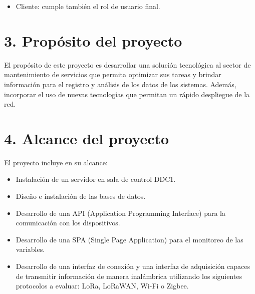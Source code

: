 \documentclass[
11pt%
]{charter}
\begin{document}
\begin{itemize}
	\item Cliente: cumple también el rol de usuario final.

\end{itemize}





\section{3. Propósito del proyecto}
\label{sec:proposito}




El propósito de este proyecto es desarrollar una solución tecnológica al sector de mantenimiento de servicios que permita optimizar sus tareas y brindar información para el registro y análisis de los datos de los sistemas. Además, incorporar el uso de nuevas tecnologías que permitan un rápido despliegue de la red.







\section{4. Alcance del proyecto}
\label{sec:alcance}


El proyecto incluye en su alcance:
\begin{itemize} 
	\item Instalación de un servidor en sala de control DDC1.
	\item Diseño e instalación de las bases de datos.
	\item Desarrollo de una API (Application Programming Interface) para la comunicación con los dispositivos.
	\item Desarrollo de una SPA (Single Page Application) para el monitoreo de las variables.
	\item Desarrollo de una interfaz de conexión y una interfaz de adquisición capaces de transmitir información de manera inalámbrica utilizando los siguientes protocolos a evaluar: LoRa, LoRaWAN, Wi-Fi o Zigbee.
	
\end{itemize}
\end{document}

